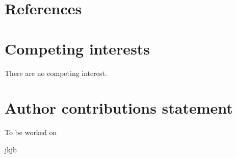 \documentclass[webpdf,large,contemporary,namedate]{oup-authoring-template}
\theoremstyle{thmstyleone}
\theoremstyle{thmstyletwo}
\theoremstyle{thmstylethree}
\begin{document}
\hypertarget{references}{%
\section{References}\label{references}}

\section{Competing interests}

There are no competing interest.

\section{Author contributions statement}

To be worked on


\renewcommand\refname{Supplementarry material}




\begin{biography}{%
%
}{\author{Fay Webster} jkjb}
\end{biography}
\end{document}

